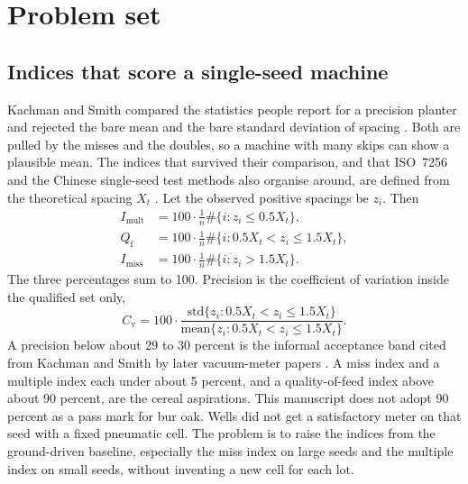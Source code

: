 \section{Problem set}
\label{sec:problem}

\subsection{Indices that score a single-seed machine}

Kachman and Smith compared the statistics people report for a precision planter and rejected the bare mean and the bare standard deviation of spacing \cite{kachman1995}. Both are pulled by the misses and the doubles, so a machine with many skips can show a plausible mean. The indices that survived their comparison, and that ISO~7256 and the Chinese single-seed test methods also organise around, are defined from the theoretical spacing $X_t$ \cite{iso7256,gb6973,panning2000}. Let the observed positive spacings be $z_i$. Then
\begin{align}
I_{\mathrm{mult}} &= 100\cdot\frac{1}{n}\#\{i: z_i \le 0.5 X_t\}, \label{eq:imult}\\
Q_{\mathrm{f}} &= 100\cdot\frac{1}{n}\#\{i: 0.5 X_t < z_i \le 1.5 X_t\}, \label{eq:qf}\\
I_{\mathrm{miss}} &= 100\cdot\frac{1}{n}\#\{i: z_i > 1.5 X_t\}. \label{eq:imiss}
\end{align}
The three percentages sum to 100. Precision is the coefficient of variation inside the qualified set only,
\begin{equation}
C_{\mathrm{v}} = 100\cdot\frac{\mathrm{std}\{z_i: 0.5 X_t < z_i \le 1.5 X_t\}}{\mathrm{mean}\{z_i: 0.5 X_t < z_i \le 1.5 X_t\}}.
\label{eq:cv}
\end{equation}
A precision below about 29 to 30 percent is the informal acceptance band cited from Kachman and Smith by later vacuum-meter papers \cite{onal2012}. A miss index and a multiple index each under about 5 percent, and a quality-of-feed index above about 90 percent, are the cereal aspirations. This manuscript does not adopt 90 percent as a pass mark for bur oak. Wells did not get a satisfactory meter on that seed with a fixed pneumatic cell. The problem is to raise the indices from the ground-driven baseline, especially the miss index on large seeds and the multiple index on small seeds, without inventing a new cell for each lot.

